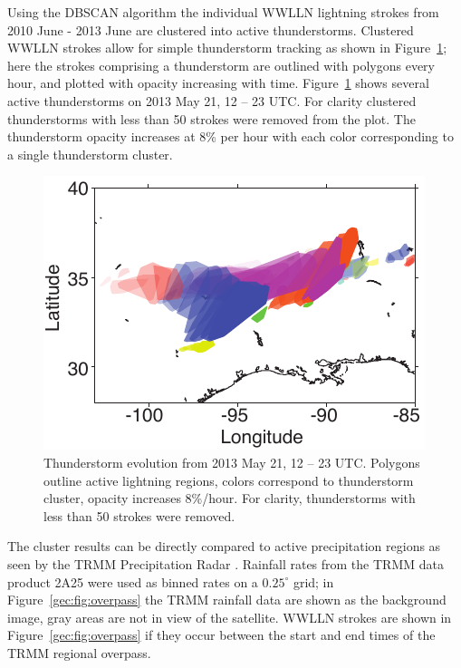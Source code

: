 Using the DBSCAN algorithm the individual WWLLN lightning strokes from 2010 June - 2013 June are clustered into active thunderstorms.
Clustered WWLLN strokes allow for simple thunderstorm tracking as shown in Figure~\ref{gec:fig:evolution}; here the strokes comprising a thunderstorm are outlined with polygons every hour, and plotted with opacity increasing with time.
Figure~\ref{gec:fig:evolution} shows several active thunderstorms on 2013 May 21, 12 -- 23 UTC.
For clarity clustered thunderstorms with less than 50 strokes were removed from the plot.
The thunderstorm opacity increases at 8\% per hour with each color corresponding to a single thunderstorm cluster.

 \begin{figure}[ht!]
    \centering
    \includegraphics[scale=1]{GEC/Figures/evolution.pdf}
    \caption{Thunderstorm evolution from 2013 May 21, 12 -- 23 UTC.
    		 Polygons outline active lightning regions, colors correspond to thunderstorm cluster, opacity increases 8\%/hour.
		 For clarity, thunderstorms with less than 50 strokes were removed.}
    \label{gec:fig:evolution}
 \end{figure}

The cluster results can be directly compared to active precipitation regions as seen by the TRMM Precipitation Radar \citep{Kawanishi2000}.
Rainfall rates from the TRMM data product 2A25 were used as binned rates on a $0.25^\circ$ grid; in Figure~\ref{gec:fig:overpass} the TRMM rainfall data are shown as the background image, gray areas are not in view of the satellite.
WWLLN strokes are shown in Figure~\ref{gec:fig:overpass} if they occur between the start and end times of the TRMM regional overpass.

